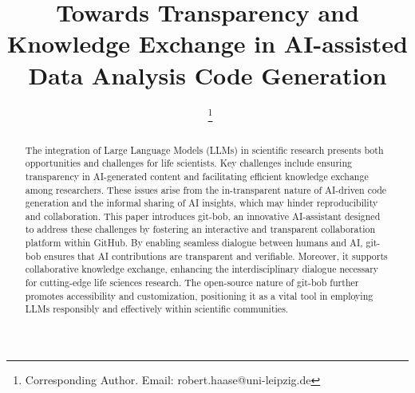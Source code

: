 \documentclass{ecai}
\begin{document}
\linenumbers


\begin{frontmatter}




\title{Towards Transparency and Knowledge Exchange in AI-assisted Data Analysis Code Generation}


\author[A,B]{~\thanks{Corresponding Author. Email: robert.haase@uni-leipzig.de}}

\address[A]{Data Science Center, Leipzig University, Humboldtstra{\ss}e 25, 04105 Leipzig, Germany}
\address[B]{Center for Scalable Data Analytics and Artificial Intelligence (ScaDS.AI) Dresden / Leipzig}


\begin{abstract}

The integration of Large Language Models (LLMs) in scientific research presents both opportunities and challenges for life scientists. Key challenges include ensuring transparency in AI-generated content and facilitating efficient knowledge exchange among researchers. These issues arise from the in-transparent nature of AI-driven code generation and the informal sharing of AI insights, which may hinder reproducibility and collaboration. This paper introduces git-bob, an innovative AI-assistant designed to address these challenges by fostering an interactive and transparent collaboration platform within GitHub. By enabling seamless dialogue between humans and AI, git-bob ensures that AI contributions are transparent and verifiable. Moreover, it supports collaborative knowledge exchange, enhancing the interdisciplinary dialogue necessary for cutting-edge life sciences research. The open-source nature of git-bob further promotes accessibility and customization, positioning it as a vital tool in employing LLMs responsibly and effectively within scientific communities.

\end{abstract}

\end{frontmatter}
\end{document}
